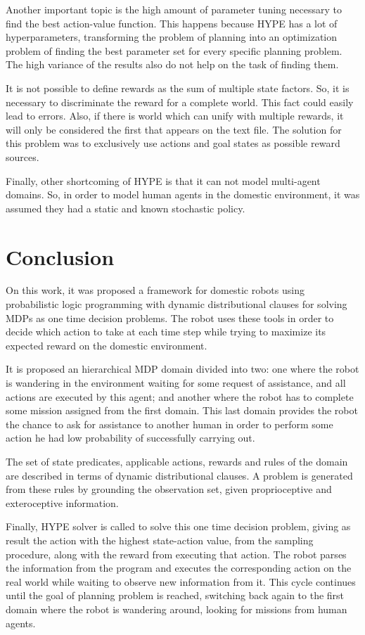 Another important topic is the high amount of parameter tuning necessary to find
the best action-value function. This happens because \gls{HYPE} has a lot of
hyperparameters, transforming the problem of planning into an
optimization problem of finding the best parameter set for every specific
planning problem. The high variance of the results also do not help on the task
of finding them.

It is not possible to define rewards as the sum of multiple state factors. So,
it is necessary to discriminate the reward for a complete world. This fact could
easily lead to errors. Also, if there is world which can unify with multiple
rewards, it will only be considered the first that appears on the text file. The
solution for this problem was to exclusively use actions and goal states as
possible reward sources.

Finally, other shortcoming of \gls{HYPE} is that it can not model multi-agent
domains. So, in order to model human agents in the domestic environment, it was
assumed they had a static and known stochastic policy.

\chapter{Conclusion}

On this work, it was proposed a framework for domestic robots using probabilistic
logic programming with dynamic distributional clauses for solving \glspl{MDP}
as one time decision problems. The robot uses these tools in order to decide
which action to take at each time step while trying to maximize its expected
reward on the domestic environment.

It is proposed an hierarchical \gls{MDP} domain divided into two: one where 
the robot is wandering in the environment waiting for
some request of assistance, and all actions are executed by this agent; and
another where the robot has to complete some mission assigned from the first
domain. This last domain provides the robot the chance to ask for assistance to
another human in order to perform some action he had low probability of
successfully carrying out.

The set of state predicates, applicable actions, rewards and rules of the domain
are described in terms of dynamic distributional clauses. A problem is generated
from these rules by grounding the observation set, given proprioceptive and
exteroceptive information.

Finally, \gls{HYPE} solver is called to solve this one time decision problem,
giving as result the action with the highest state-action value, from the
sampling procedure, along with the reward from executing that action.
The robot parses the information from the program and executes the corresponding
action on the real world while waiting to observe new information from it.
This cycle continues until the goal of planning problem is reached, switching
back again to the first domain where the robot is wandering around, looking for
missions from human agents.

